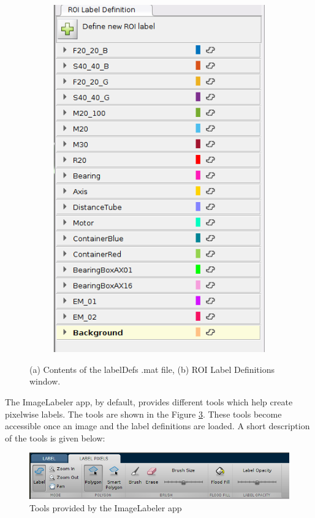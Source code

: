\begin{figure}
\begin{subfigure}{.5\textwidth}
			\includegraphics[width=0.83\linewidth]{images/roi_label_defintions}
			\caption{}
			\label{Fig:ROI}
		\end{subfigure}
		\caption{(a) Contents of the labelDefs .mat file, (b) ROI Label Definitions window.}
		\label{Fig:def_ROI}
	\end{figure}
	
The ImageLabeler app, by default, provides different tools which help create pixelwise labels. The tools are shown in the Figure \ref{Fig:IL_tools}. These tools become accessible once an image and the label definitions are loaded. A short description of the tools is given below:
	\begin{figure}
		\centering
		\includegraphics[scale=0.55]{images/label_tools}
		\caption{Tools provided by the ImageLabeler app}
		\label{Fig:IL_tools}
	\end{figure}
	
